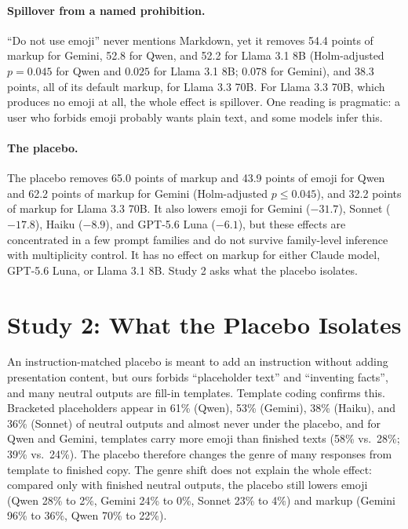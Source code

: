 \documentclass[acmsmall,screen,review,anonymous]{acmart}
\begin{document}
\paragraph{Spillover from a named prohibition.} ``Do not use emoji'' never mentions Markdown, yet it removes 54.4 points of markup for Gemini, 52.8 for Qwen, and 52.2 for Llama 3.1 8B (Holm-adjusted $p=0.045$ for Qwen and $0.025$ for Llama 3.1 8B; $0.078$ for Gemini), and 38.3 points, all of its default markup, for Llama 3.3 70B. For Llama 3.3 70B, which produces no emoji at all, the whole effect is spillover. One reading is pragmatic: a user who forbids emoji probably wants plain text, and some models infer this.

\paragraph{The placebo.} The placebo removes 65.0 points of markup and 43.9 points of emoji for Qwen and 62.2 points of markup for Gemini (Holm-adjusted $p\le0.045$), and 32.2 points of markup for Llama 3.3 70B. It also lowers emoji for Gemini ($-31.7$), Sonnet ($-17.8$), Haiku ($-8.9$), and GPT-5.6 Luna ($-6.1$), but these effects are concentrated in a few prompt families and do not survive family-level inference with multiplicity control. It has no effect on markup for either Claude model, GPT-5.6 Luna, or Llama 3.1 8B. Study 2 asks what the placebo isolates.

\section{Study 2: What the Placebo Isolates}
\label{sec:study2}

An instruction-matched placebo is meant to add an instruction without adding presentation content, but ours forbids ``placeholder text'' and ``inventing facts'', and many neutral outputs are fill-in templates. Template coding confirms this. Bracketed placeholders appear in 61\% (Qwen), 53\% (Gemini), 38\% (Haiku), and 36\% (Sonnet) of neutral outputs and almost never under the placebo, and for Qwen and Gemini, templates carry more emoji than finished texts (58\% vs.\ 28\%; 39\% vs.\ 24\%). The placebo therefore changes the genre of many responses from template to finished copy. The genre shift does not explain the whole effect: compared only with finished neutral outputs, the placebo still lowers emoji (Qwen 28\% to 2\%, Gemini 24\% to 0\%, Sonnet 23\% to 4\%) and markup (Gemini 96\% to 36\%, Qwen 70\% to 22\%).
\end{document}
